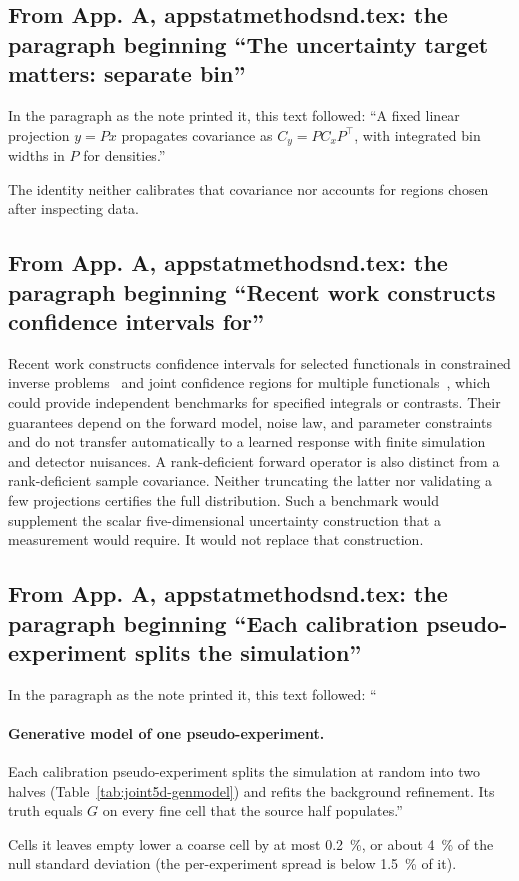 \subsection{From App. A, appstatmethodsnd.tex: the paragraph beginning ``The uncertainty target matters: separate bin''}
In the paragraph as the note printed it, this text followed: ``A fixed linear projection $y=P x$ propagates covariance as $C_y=P C_x P^{\top}$, with integrated bin widths in $P$ for densities.''\par
The identity neither calibrates that covariance nor accounts for regions chosen after inspecting data.

\subsection{From App. A, appstatmethodsnd.tex: the paragraph beginning ``Recent work constructs confidence intervals for''}
Recent work constructs confidence intervals for selected functionals in constrained inverse problems~\cite{Stanley:2025functionals} and joint confidence regions for multiple functionals~\cite{Batlle:2025simultaneous}, which could provide independent benchmarks for specified integrals or contrasts. Their guarantees depend on the forward model, noise law, and parameter constraints and do not transfer automatically to a learned response with finite simulation and detector nuisances. A rank-deficient forward operator is also distinct from a rank-deficient sample covariance. Neither truncating the latter nor validating a few projections certifies the full distribution. Such a benchmark would supplement the scalar five-dimensional uncertainty construction that a measurement would require. It would not replace that construction.

\subsection{From App. A, appstatmethodsnd.tex: the paragraph beginning ``Each calibration pseudo-experiment splits the simulation''}
In the paragraph as the note printed it, this text followed: ``\paragraph{Generative model of one pseudo-experiment.} Each calibration pseudo-experiment splits the simulation at random into two halves (Table~\ref{tab:joint5d-genmodel}) and refits the background refinement. Its truth equals $G$ on every fine cell that the source half populates.''\par
Cells it leaves empty lower a coarse cell by at most \SI{0.2}{\percent}, or about \SI{4}{\percent} of the null standard deviation (the per-experiment spread is below \SI{1.5}{\percent} of it).

